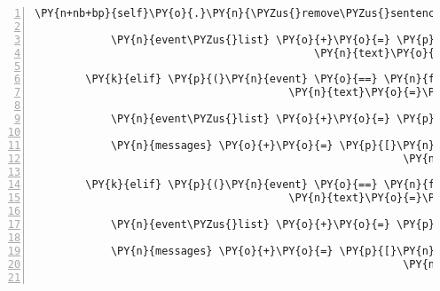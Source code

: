 \begin{Verbatim}[commandchars=\\\{\},numbers=left,firstnumber=1,stepnumber=1]
            \PY{n+nb+bp}{self}\PY{o}{.}\PY{n}{\PYZus{}remove\PYZus{}sentence}\PY{p}{(}\PY{n}{ID\PYZus{}KUNI}\PY{p}{,} \PY{n}{event}\PY{o}{.}\PY{n}{text}\PY{p}{)}

            \PY{n}{event\PYZus{}list} \PY{o}{+}\PY{o}{=} \PY{p}{[}\PY{n}{fabula}\PY{o}{.}\PY{n}{SaysEvent}\PY{p}{(}\PY{n}{identifier}\PY{o}{=}\PY{n}{ID\PYZus{}CASSANDRA}\PY{p}{,}
                                            \PY{n}{text}\PY{o}{=}\PY{l+s}{\PYZsq{}}\PY{l+s}{Vielleicht kann ich damit meinen Flügel kleben?}\PY{l+s}{\PYZsq{}}\PY{p}{)}\PY{p}{]}

        \PY{k}{elif} \PY{p}{(}\PY{n}{event} \PY{o}{==} \PY{n}{fabula}\PY{o}{.}\PY{n}{SaysEvent}\PY{p}{(}\PY{n}{identifier}\PY{o}{=}\PY{n}{ID\PYZus{}KUNI}\PY{p}{,}
                                        \PY{n}{text}\PY{o}{=}\PY{l+s}{\PYZsq{}}\PY{l+s}{Rück mal ein Stück!}\PY{l+s}{\PYZsq{}}\PY{p}{)}\PY{p}{)}\PY{p}{:}

            \PY{n}{event\PYZus{}list} \PY{o}{+}\PY{o}{=} \PY{p}{[}\PY{n}{fabula}\PY{o}{.}\PY{n}{SaysEvent}\PY{p}{(}\PY{l+s}{\PYZsq{}}\PY{l+s}{spider}\PY{l+s}{\PYZsq{}}\PY{p}{,} \PY{l+s}{\PYZsq{}}\PY{l+s}{Raaar! schirr!}\PY{l+s}{\PYZsq{}}\PY{p}{)}\PY{p}{]}

            \PY{n}{messages} \PY{o}{+}\PY{o}{=} \PY{p}{[}\PY{n}{fabula}\PY{o}{.}\PY{n}{Message}\PY{p}{(}\PY{p}{[}\PY{n}{fabula}\PY{o}{.}\PY{n}{SaysEvent}\PY{p}{(}\PY{n}{identifier}\PY{o}{=}\PY{n}{ID\PYZus{}KUNI}\PY{p}{,}
                                                          \PY{n}{text}\PY{o}{=}\PY{l+s}{\PYZsq{}}\PY{l+s}{Öhm nichts für ungut, ich komm später wieder!}\PY{l+s}{\PYZsq{}}\PY{p}{)}\PY{p}{]}\PY{p}{)}\PY{p}{]}

        \PY{k}{elif} \PY{p}{(}\PY{n}{event} \PY{o}{==} \PY{n}{fabula}\PY{o}{.}\PY{n}{SaysEvent}\PY{p}{(}\PY{n}{identifier}\PY{o}{=}\PY{n}{ID\PYZus{}KUNI}\PY{p}{,}
                                        \PY{n}{text}\PY{o}{=}\PY{l+s}{\PYZsq{}}\PY{l+s}{Öhm, kannst du mal beiseite treten?}\PY{l+s}{\PYZsq{}}\PY{p}{)}\PY{p}{)}\PY{p}{:}

            \PY{n}{event\PYZus{}list} \PY{o}{+}\PY{o}{=} \PY{p}{[}\PY{n}{fabula}\PY{o}{.}\PY{n}{SaysEvent}\PY{p}{(}\PY{l+s}{\PYZsq{}}\PY{l+s}{spider}\PY{l+s}{\PYZsq{}}\PY{p}{,} \PY{l+s}{\PYZsq{}}\PY{l+s}{Raaar! Ich beiß dich gleich!}\PY{l+s}{\PYZsq{}}\PY{p}{)}\PY{p}{]}

            \PY{n}{messages} \PY{o}{+}\PY{o}{=} \PY{p}{[}\PY{n}{fabula}\PY{o}{.}\PY{n}{Message}\PY{p}{(}\PY{p}{[}\PY{n}{fabula}\PY{o}{.}\PY{n}{SaysEvent}\PY{p}{(}\PY{n}{identifier}\PY{o}{=}\PY{n}{ID\PYZus{}KUNI}\PY{p}{,}
                                                          \PY{n}{text}\PY{o}{=}\PY{l+s}{\PYZsq{}}\PY{l+s}{Ähm, ich geh dann mal!}\PY{l+s}{\PYZsq{}}\PY{p}{)}\PY{p}{]}\PY{p}{)}\PY{p}{]}


\end{Verbatim}
